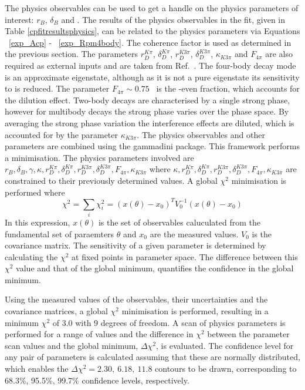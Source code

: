 The physics observables can be used to get a handle on the physics parameters of interest: $r_B$, $\delta_B$ and \Pgamma. 
The results of the physics observables in the \CP fit, given in Table \ref{cpfitresultsphysics}, can be related to the physics parameters via Equations ~\ref{exp_Acp} - ~\ref{exp_Rpm4body}. The coherence factor is used as determined in the previous section. The parameters $r_D^{K\pi}$, $\delta_D^{K\pi}$, $r_D^{K3\pi}$, $\delta_D^{K3\pi}$, $\kappa_{K3\pi}$ and $F_{4\pi}$ are also required as external inputs and are taken from Ref.~\cite{HFAG,charmk3pi,LHCb-PAPER-2015-057,charm4pi}. The four-body \D decay mode \decay{\D}{\pip\pim\pip\pim} is an approximate \CP eigenstate, although as it is not a pure \CP eigenstate its sensitivity to \Pgamma is reduced. The parameter $F_{4\pi} \sim 0.75$~\cite{charm4pi} is the \CP-even fraction, which accounts for the dilution effect. Two-body \decay{\D}{\Kmp\pipm} decays are characterised by a single strong phase, however for multibody \decay{\D}{\Kmp\pipm\pimp\pipm} decays the strong phase varies over the phase space. By averaging the strong phase variation the interference effects are diluted, which is accounted for by the parameter $\kappa_{K3\pi}$. The physics observables and other parameters are combined using the gammadini package. This framework performs a minimisation. The physics parameters involved are $r_B, \delta_B, \gamma, \kappa, r_D^{K\pi}, \delta_D^{K\pi}, r_D^{K3\pi}, \delta_D^{K3\pi}, F_{4\pi}, \kappa_{K3\pi}$ where $\kappa, r_D^{K\pi}, \delta_D^{K\pi}, r_D^{K3\pi}, \delta_D^{K3\pi}, F_{4\pi}, \kappa_{K3\pi}$ are constrained to their previously determined values. A global $\chi^2$ minimisation is performed where
\begin{equation}
\chi^2 = \sum_i \chi^2_i = (x(\theta) - x_0)^TV_0^{-1}(x(\theta)-x_0)
\end{equation}
In this expression, $x(\theta)$ is the set of observables caluculated from the fundamental set of paraemters $\theta$ and $x_0$ are the measured values. $V_0$ is the covariance matrix.
The sensitivity of a given parameter is determined by calculating the $\chi^2$ at fixed points in parameter space. The difference between this $\chi^2$ value and that of the global minimum, quantifies the confidence in the global minimum. 

Using the measured values of the \CP observables, their uncertainties and the covariance matrices, a global $\chi^2$ minimisation is performed, resulting in a minimum $\chi^2$ of 3.0 with 9 degrees of freedom. A scan of physics parameters is performed for a range of values and the difference in $\chi^2$ between the parameter scan values and the global minimum, $\Delta\chi^2$, is evaluated. The confidence level for any pair of parameters is calculated assuming that these are normally distributed, which enables the $\Delta \chi^2 = 2.30,\ 6.18,\ 11.8$ contours to be drawn, corresponding to 68.3\%, 95.5\%, 99.7\% confidence levels, respectively. 

